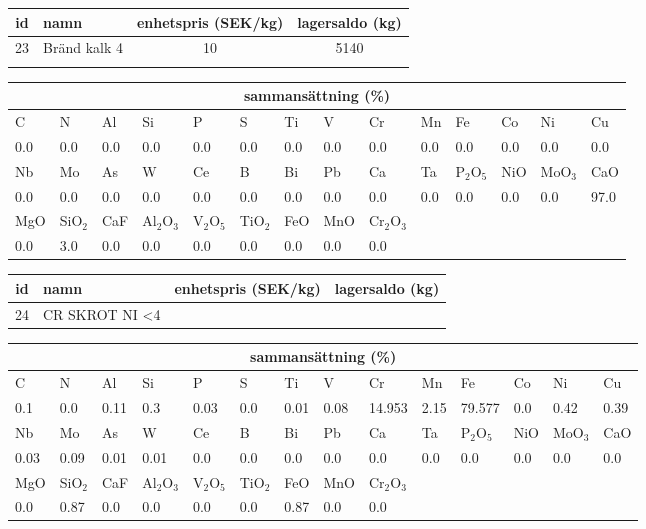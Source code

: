 \begin{center}
{\scriptsize\addtolength{\tabcolsep}{-3pt}
\begin{tabular}{clcc}
id&namn&enhetspris (SEK/kg)&lagersaldo (kg)\\
\hline
23&Bränd kalk 4&10&5140\\\\
\end{tabular}
\begin{tabular}{llllllllllllll}
\multicolumn{14}{c}{sammansättning (\%)}\\
\hline
C&N&Al&Si&P&S&Ti&V&Cr&Mn&Fe&Co&Ni&Cu\\
\hline
0.0&0.0&0.0&0.0& 0.0&0.0&0.0&0.0& 0.0&0.0&0.0&0.0& 0.0&0.0\\
\hline
Nb&Mo&As&W&Ce&B&Bi&Pb&Ca&Ta&P$_2$O$_5$&NiO&MoO$_3$&CaO\\
\hline
0.0& 0.0& 0.0& 0.0& 0.0& 0.0& 0.0& 0.0& 0.0& 0.0& 0.0& 0.0& 0.0& 97.0\\
\hline
MgO&SiO$_2$&CaF&Al$_2$O$_3$&V$_2$O$_5$&TiO$_2$&FeO&MnO&Cr$_2$O$_3$\\
\hline
0.0& 3.0& 0.0& 0.0& 0.0& 0.0& 0.0& 0.0& 0.0\\
\end{tabular}
}
\end{center}

\begin{center}
{\scriptsize\addtolength{\tabcolsep}{-3pt}
\begin{tabular}{clcc}
id&namn&enhetspris (SEK/kg)&lagersaldo (kg)\\
\hline
24&CR SKROT NI <4%
\end{tabular}
\begin{tabular}{llllllllllllll}
\multicolumn{14}{c}{sammansättning (\%)}\\
\hline
C&N&Al&Si&P&S&Ti&V&Cr&Mn&Fe&Co&Ni&Cu\\
\hline
0.1&0.0&0.11&0.3& 0.03&0.0&0.01&0.08& 14.953&2.15&79.577&0.0& 0.42&0.39\\
\hline
Nb&Mo&As&W&Ce&B&Bi&Pb&Ca&Ta&P$_2$O$_5$&NiO&MoO$_3$&CaO\\
\hline
0.03& 0.09& 0.01& 0.01& 0.0& 0.0& 0.0& 0.0& 0.0& 0.0& 0.0& 0.0& 0.0& 0.0\\
\hline
MgO&SiO$_2$&CaF&Al$_2$O$_3$&V$_2$O$_5$&TiO$_2$&FeO&MnO&Cr$_2$O$_3$\\
\hline
0.0& 0.87& 0.0& 0.0& 0.0& 0.0& 0.87& 0.0& 0.0\\
\end{tabular}
}
\end{center}

